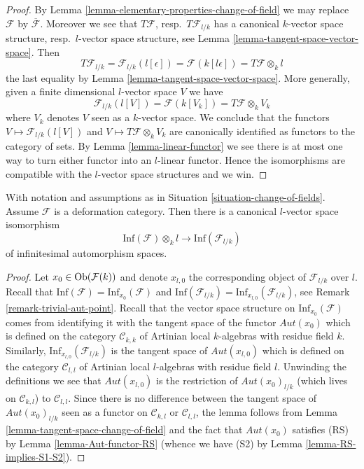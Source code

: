 \begin{proof}
By Lemma \ref{lemma-elementary-properties-change-of-field} we may replace
$\mathcal{F}$ by $\overline{\mathcal{F}}$. Moreover we see that
$T\mathcal{F}$, resp.\ $T\mathcal{F}_{l/k}$ has a canonical
$k$-vector space structure, resp.\ $l$-vector space structure, see
Lemma \ref{lemma-tangent-space-vector-space}. Then
$$
T\mathcal{F}_{l/k} = \mathcal{F}_{l/k}(l[\epsilon])
= \mathcal{F}(k[l\epsilon]) = T\mathcal{F} \otimes_k l
$$
the last equality by Lemma \ref{lemma-tangent-space-vector-space}.
More generally, given a finite dimensional $l$-vector space $V$ we have
$$
\mathcal{F}_{l/k}(l[V]) = \mathcal{F}(k[V_k]) = T\mathcal{F} \otimes_k V_k
$$
where $V_k$ denotes $V$ seen as a $k$-vector space. We conclude that
the functors $V \mapsto \mathcal{F}_{l/k}(l[V])$ and
$V \mapsto T\mathcal{F} \otimes_k V_k$ are canonically identified
as functors to the category of sets. By Lemma \ref{lemma-linear-functor}
we see there is at most one way to turn either functor into an $l$-linear
functor. Hence the isomorphisms are compatible with the $l$-vector space
structures and we win.
\end{proof}

\begin{lemma}
\label{lemma-inf-aut-change-of-field}
With notation and assumptions as in Situation \ref{situation-change-of-fields}.
Assume $\mathcal{F}$ is a deformation category.
Then there is a
canonical $l$-vector space isomorphism
$$
\text{Inf}(\mathcal{F}) \otimes_k l
\longrightarrow
\text{Inf}(\mathcal{F}_{l/k})
$$
of infinitesimal automorphism spaces.
\end{lemma}

\begin{proof}
Let $x_0 \in \mathop{\mathrm{Ob}}\nolimits(\mathcal{F}(k))$ and denote $x_{l, 0}$ the corresponding
object of $\mathcal{F}_{l/k}$ over $l$. Recall that
$\text{Inf}(\mathcal{F}) = \text{Inf}_{x_0}(\mathcal{F})$ and
$\text{Inf}(\mathcal{F}_{l/k}) = \text{Inf}_{x_{l, 0}}(\mathcal{F}_{l/k})$,
see Remark \ref{remark-trivial-aut-point}.
Recall that the vector space structure on
$\text{Inf}_{x_0}(\mathcal{F})$ comes from identifying it with the tangent
space of the functor $\mathit{Aut}(x_0)$ which is defined on
the category $\mathcal{C}_{k, k}$ of Artinian local $k$-algebras with
residue field $k$. Similarly, $\text{Inf}_{x_{l, 0}}(\mathcal{F}_{l/k})$
is the tangent space of $\mathit{Aut}(x_{l, 0})$ which is defined on the
category $\mathcal{C}_{l, l}$ of Artinian local $l$-algebras with residue
field $l$. Unwinding the definitions we see that
$\mathit{Aut}(x_{l, 0})$ is the restriction of $\mathit{Aut}(x_0)_{l/k}$
(which lives on $\mathcal{C}_{k, l}$) to $\mathcal{C}_{l, l}$. Since
there is no difference between the tangent space of
$\mathit{Aut}(x_0)_{l/k}$ seen as a functor on $\mathcal{C}_{k, l}$ or
$\mathcal{C}_{l, l}$, the lemma follows from 
Lemma \ref{lemma-tangent-space-change-of-field}
and the fact that $\mathit{Aut}(x_0)$ satisfies (RS) by
Lemma \ref{lemma-Aut-functor-RS} (whence we have (S2) by
Lemma \ref{lemma-RS-implies-S1-S2}).
\end{proof}

